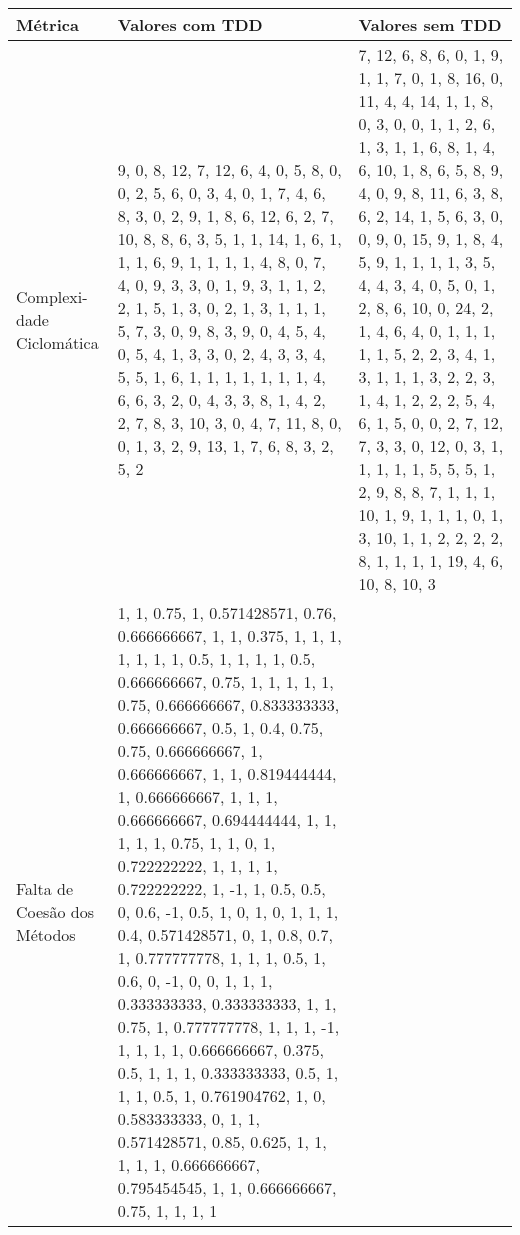 \begin{longtable}{| p{2cm} | p{6.5cm} | p{6.5cm} | }
		\hline
		Métrica & Valores com TDD & Valores sem TDD\\
		\hline
		Complexi- dade Ciclomática &	
		9, 0, 8, 12, 7, 12, 6, 4, 0, 5, 8, 0, 0, 2, 5, 6, 0, 3, 4, 0, 1, 7, 4, 6, 8, 3, 0, 2, 9, 1, 8, 6, 12, 6, 2, 7, 10, 8, 8, 6, 3, 5, 1, 1, 14, 1, 6, 1, 1, 1, 6, 9, 1, 1, 1, 1, 4, 8, 0, 7, 4, 0, 9, 3, 3, 0, 1, 9, 3, 1, 1, 2, 2, 1, 5, 1, 3, 0, 2, 1, 3, 1, 1, 1, 5, 7, 3, 0, 9, 8, 3, 9, 0, 4, 5, 4, 0, 5, 4, 1, 3, 3, 0, 2, 4, 3, 3, 4, 5, 5, 1, 6, 1, 1, 1, 1, 1, 1, 1, 4, 6, 6, 3, 2, 0, 4, 3, 3, 8, 1, 4, 2, 2, 7, 8, 3, 10, 3, 0, 4, 7, 11, 8, 0, 0, 1, 3, 2, 9, 13, 1, 7, 6, 8, 3, 2, 5, 2&
		
		7, 12, 6, 8, 6, 0, 1, 9, 1, 1, 7, 0, 1, 8, 16, 0, 11, 4, 4, 14, 1, 1, 8, 0, 3, 0, 0, 1, 1, 2, 6, 1, 3, 1, 1, 6, 8, 1, 4, 6, 10, 1, 8, 6, 5, 8, 9, 4, 0, 9, 8, 11, 6, 3, 8, 6, 2, 14, 1, 5, 6, 3, 0, 0, 9, 0, 15, 9, 1, 8, 4, 5, 9, 1, 1, 1, 1, 3, 5, 4, 4, 3, 4, 0, 5, 0, 1, 2, 8, 6, 10, 0, 24, 2, 1, 4, 6, 4, 0, 1, 1, 1, 1, 1, 5, 2, 2, 3, 4, 1, 3, 1, 1, 1, 3, 2, 2, 3, 1, 4, 1, 2, 2, 2, 5, 4, 6, 1, 5, 0, 0, 2, 7, 12, 7, 3, 3, 0, 12, 0, 3, 1, 1, 1, 1, 1, 5, 5, 5, 1, 2, 9, 8, 8, 7, 1, 1, 1, 10, 1, 9, 1, 1, 1, 0, 1, 3, 10, 1, 1, 2, 2, 2, 2, 8, 1, 1, 1, 1, 19, 4, 6, 10, 8, 10, 3\\
		
		\hline
		
		Falta de Coesão dos Métodos &	
		1, 1, 0.75, 1, 0.571428571, 0.76, 0.666666667, 1, 1, 0.375, 1, 1, 1, 1, 1, 1, 1, 0.5, 1, 1, 1, 1, 0.5, 0.666666667, 0.75, 1, 1, 1, 1, 1, 0.75, 0.666666667, 0.833333333, 0.666666667, 0.5, 1, 0.4, 0.75, 0.75, 0.666666667, 1, 0.666666667, 1, 1, 0.819444444, 1, 0.666666667, 1, 1, 1, 0.666666667, 0.694444444, 1, 1, 1, 1, 1, 0.75, 1, 1, 0, 1, 0.722222222, 1, 1, 1, 1, 0.722222222, 1, -1, 1, 0.5, 0.5, 0, 0.6, -1, 0.5, 1, 0, 1, 0, 1, 1, 1, 0.4, 0.571428571, 0, 1, 0.8, 0.7, 1, 0.777777778, 1, 1, 1, 0.5, 1, 0.6, 0, -1, 0, 0, 1, 1, 1, 0.333333333, 0.333333333, 1, 1, 0.75, 1, 0.777777778, 1, 1, 1, -1, 1, 1, 1, 1, 0.666666667, 0.375, 0.5, 1, 1, 1, 0.333333333, 0.5, 1, 1, 1, 0.5, 1, 0.761904762, 1, 0, 0.583333333, 0, 1, 1, 0.571428571, 0.85, 0.625, 1, 1, 1, 1, 1, 0.666666667, 0.795454545, 1, 1, 0.666666667, 0.75, 1, 1, 1, 1 &
		

\end{longtable}
